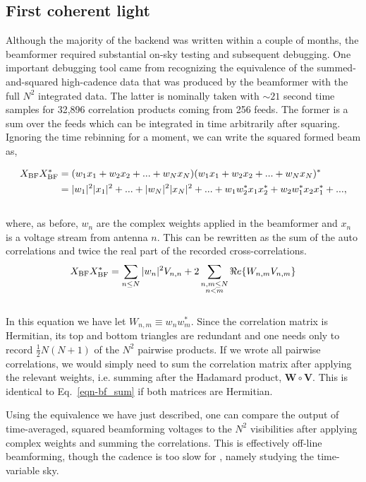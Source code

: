 \subsection{First coherent light}
Although the majority of the backend was written within a couple  
of months, the beamformer required substantial 
on-sky testing and subsequent debugging. One important debugging tool 
came from recognizing the equivalence of the summed-and-squared
high-cadence data that was produced by the beamformer with the 
full $N^2$ integrated data. The latter is nominally taken with $\sim21$ second
time samples for 32,896 correlation products coming from 256 feeds. 
The former is a sum over the feeds which can be integrated in time 
arbitrarily after squaring. Ignoring the time rebinning for a moment,
we can write the squared formed beam as,

\begin{align}
X_{\rm BF} X_{\rm BF}^* &= (w_1 x_1 + w_2 x_2 + ... + w_N x_N) (w_1 x_1 + w_2 x_2 + ... + w_N x_N)^*\\
&= |w_1|^2|x_1|^2 + ... + |w_N|^2|x_N|^2 + ... + w_1 w_2^* x_1 x_2^* + w_2 w_1^* x_2 x_1^* + ... , 
\end{align}
\\

\noindent where, as before, $w_n$ are the 
complex weights applied in the beamformer 
and $x_n$ is a voltage stream from antenna $n$.
This can be rewritten as the sum of the 
auto correlations and twice the real part of the recorded cross-correlations.
\\

\begin{equation}
\label{eqn-bf_sum}
X_{\rm BF} X_{\rm BF}^* = \sum_{n\le N} |w_n|^2 V_{n, n} + 
2 \sum_{\substack{n,m\le N \\ n<m}} \Re e\{W_{n, m} V_{n, m}\}
\end{equation}
\\

In this equation we have let $W_{n, m} \equiv w_n w_m^*$.
Since the correlation matrix is Hermitian, its top 
and bottom triangles are redundant and one needs only to 
record $\frac{1}{2} N (N+1)$ of the $N^2$ pairwise products.
If we wrote all pairwise correlations, we would simply need 
to sum the correlation matrix after applying the relevant 
weights, i.e. summing after the Hadamard
product, $\mathbf{W} \circ \mathbf{V}$. This is identical 
to Eq.~\ref{eqn-bf_sum} if both matrices are Hermitian. 

Using the equivalence we have just described, one can compare the 
output of time-averaged, squared beamforming voltages to 
the $N^2$ visibilities after applying complex 
weights and summing the correlations. This is effectively 
off-line beamforming, though the cadence is too slow for 
, namely studying the time-variable sky. 



